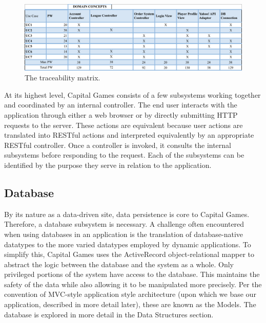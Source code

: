 \begin{figure}[H]
\centering
\includegraphics[width=5.5in]{./img/tracedomain.png}
\caption{The traceability matrix.}
\end{figure}





\iffalse
At its highest level, Capital Games consists of a few subsystems
working together and coordinated by an internal controller. The
end user interacts with the application through either a web browser
or by directly submitting HTTP requests to the server. These actions
are equivalent because user actions are translated into RESTful actions
and interpreted equivalently by an appropriate RESTful controller. \cite{wiki:restful}
Once a controller is invoked, it consults the 
internal subsystems before responding to the request. Each of the 
subsystems can be identified by the purpose they serve in relation
to the application. 


\subsection{Database}
By its nature as a data-driven site, data persistence
is core to Capital Games. Therefore, a database subsystem is necessary. 
A challenge often encountered when using databases in an application is
the translation of database-native datatypes to the more varied datatypes
employed by dynamic applications. \cite{wiki:orm} To simplify this,
Capital Games uses the ActiveRecord object-relational mapper to abstract
the logic between the database and the system as a whole. Only privileged portions
of the system have access to the database. This maintains the safety of the
data while also allowing it to be manipulated more precisely. Per the convention
of MVC-style application style architecture 
(upon which we base our application, described in more detail later), these 
are known as the Models. The database is explored in more detail in the Data Structures section.

